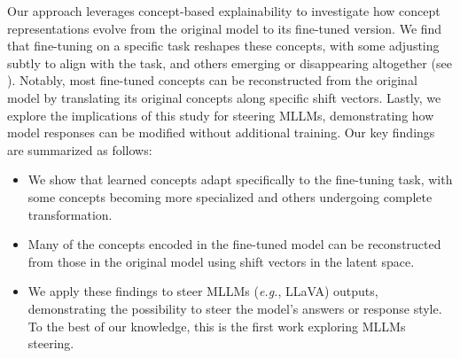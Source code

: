 Our approach leverages concept-based explainability to investigate how concept representations evolve from the original model to its fine-tuned version. We find that fine-tuning on a specific task reshapes these concepts, with some adjusting subtly to align with the task, and others emerging or disappearing altogether (see ). Notably, most fine-tuned concepts can be reconstructed from the original model by translating its original concepts along specific shift vectors. Lastly, we explore the implications of this study for steering MLLMs, demonstrating how model responses can be modified without additional training. Our key findings are summarized as follows:

\begin{itemize} 
    \item We show that learned concepts adapt specifically to the fine-tuning task, with some concepts becoming more specialized and others undergoing complete transformation. 
    \item Many of the concepts encoded in the fine-tuned model can be reconstructed from those in the original model using shift vectors in the latent space. 
    \item We apply these findings to steer MLLMs (\emph{e.g.}, LLaVA) outputs, demonstrating the possibility to steer the model’s answers or response style. To the best of our knowledge, this is the first work exploring MLLMs steering.
\end{itemize}














